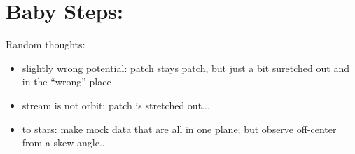 \documentclass[12pt,a4paper,twoside]{article}
\begin{document}
\section{Baby Steps:}

Random thoughts: 
\begin{itemize}
\item slightly wrong potential: patch stays patch, but just a bit suretched out and in the ``wrong'' place

\item stream is not orbit: patch is stretched out...

\item to stars: make mock data that are all in one plane; but observe off-center from a skew angle...

\end{itemize}
\end{document}
